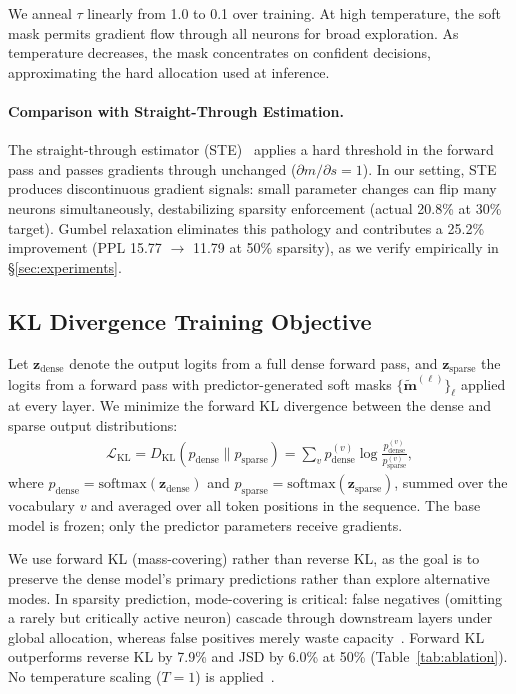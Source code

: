 We anneal $\tau$ linearly from 1.0 to 0.1 over training.
At high temperature, the soft mask permits gradient flow through all neurons for broad exploration.
As temperature decreases, the mask concentrates on confident decisions, approximating the hard allocation used at inference.

\paragraph{Comparison with Straight-Through Estimation.}
The straight-through estimator (STE)~\cite{bengio2013ste} applies a hard threshold in the forward pass and passes gradients through unchanged ($\partial m / \partial s = 1$).
In our setting, STE produces discontinuous gradient signals: small parameter changes can flip many neurons simultaneously, destabilizing sparsity enforcement (actual 20.8\% at 30\% target).
Gumbel relaxation eliminates this pathology and contributes a 25.2\% improvement (PPL 15.77 $\to$ 11.79 at 50\% sparsity), as we verify empirically in \S\ref{sec:experiments}.


\subsection{KL Divergence Training Objective}
\label{sec:method:kl}

Let $\mathbf{z}_{\text{dense}}$ denote the output logits from a full dense forward pass, and $\mathbf{z}_{\text{sparse}}$ the logits from a forward pass with predictor-generated soft masks $\{\tilde{\mathbf{m}}^{(\ell)}\}_\ell$ applied at every layer.
We minimize the forward KL divergence between the dense and sparse output distributions:
\begin{align}
\mathcal{L}_{\text{KL}} \!=\! D_{\text{KL}}(p_{\text{dense}} \| p_{\text{sparse}}) \!=\! \sum_{v} p_{\text{dense}}^{(v)} \log \frac{p_{\text{dense}}^{(v)}}{p_{\text{sparse}}^{(v)}},
\label{eq:kl_loss}
\end{align}
where $p_{\text{dense}} = \text{softmax}(\mathbf{z}_{\text{dense}})$ and $p_{\text{sparse}} = \text{softmax}(\mathbf{z}_{\text{sparse}})$, summed over the vocabulary $v$ and averaged over all token positions in the sequence.
The base model is frozen; only the predictor parameters receive gradients.

We use forward KL (mass-covering) rather than reverse KL, as the goal is to preserve the dense model's primary predictions rather than explore alternative modes.
In sparsity prediction, mode-covering is critical: false negatives (omitting a rarely but critically active neuron) cascade through downstream layers under global allocation, whereas false positives merely waste capacity~\cite{wu2025rethinking}.
Forward KL outperforms reverse KL by 7.9\% and JSD by 6.0\% at 50\% (Table~\ref{tab:ablation}).
No temperature scaling ($T{=}1$) is applied~\cite{hinton2015distilling}.


